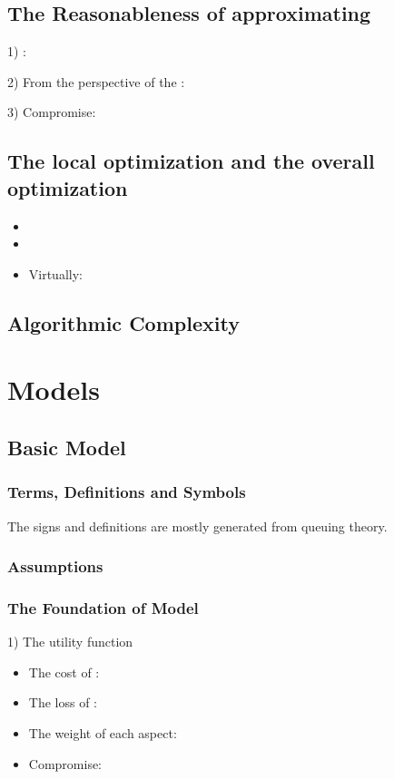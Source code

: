 \documentclass{apmcmthesis}
\begin{document}
\subsection{The Reasonableness of approximating}
1)           :\par
2) From the perspective of the      :\par
3) Compromise:

\subsection{The local optimization and the overall optimization}


\begin{itemize}
  \item
  \item
  \item Virtually:
\end{itemize}


\subsection{Algorithmic Complexity}



\section{Models}
\subsection{Basic Model}


\subsubsection{Terms, Definitions and Symbols}
The signs and definitions are mostly generated from queuing theory.


\subsubsection{Assumptions}


\subsubsection{The Foundation of Model}
1) The utility function

\begin{itemize}
  \item The cost of       :
  \item The loss of       :
  \item The weight of each aspect:
  \item Compromise:
\end{itemize}
\end{document}
